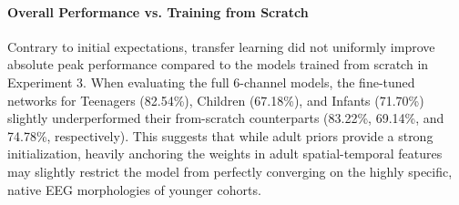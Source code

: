 \begin{table}[ht]
\centering
\caption{Test set performance for models fine-tuned from pre-trained Adult baselines. Results are shown for the 6-channel models evaluated on 6 channels, the 6-channel models evaluated on 3 channels (simulated missing data), and the 3-channel models evaluated natively on 3 channels.}
\label{tab:transfer_learning_comparison_all}
\end{table}

\paragraph{Overall Performance vs. Training from Scratch}
Contrary to initial expectations, transfer learning did not uniformly improve absolute peak performance compared to the models trained from scratch in Experiment 3. When evaluating the full 6-channel models, the fine-tuned networks for Teenagers (82.54\%), Children (67.18\%), and Infants (71.70\%) slightly underperformed their from-scratch counterparts (83.22\%, 69.14\%, and 74.78\%, respectively). This suggests that while adult priors provide a strong initialization, heavily anchoring the weights in adult spatial-temporal features may slightly restrict the model from perfectly converging on the highly specific, native EEG morphologies of younger cohorts.

